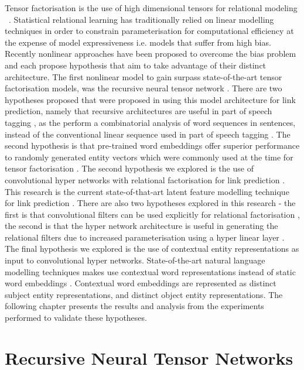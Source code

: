 Tensor factorisation is the use of high dimensional tensors for relational modeling ~\citep{Nickel_2016}. Statistical relational learning has traditionally relied on linear modelling techniques in order to constrain parameterisation for computational efficiency at the expense of model expressiveness i.e. models that suffer from high bias. Recently nonlinear approaches have been proposed to overcome the bias problem and each propose hypothesis that aim to take advantage of their distinct architecture. The first nonlinear model to gain surpass state-of-the-art tensor factorisation models, was the recursive neural tensor network \cite{refefence}. There are two hypotheses proposed that were proposed in using this model architecture for link prediction, namely that recursive architectures are useful in part of speech tagging \cite{reference}, as the perform a combinatorial analysis of word sequences in sentences, instead of the conventional linear sequence used in part of speech tagging \cite{reference}. The second hypothesis is that pre-trained word embeddings offer superior performance to randomly generated entity vectors which were commonly used at the time for tensor factorisation \cite{reference}. \newline
The second hypothesis we explored is the use of convolutional hyper networks with relational factorisation for link prediction \cite{reference}. This research is the current state-of-that-art latent feature modelling technique for link prediction \cite{reference}. There are also two hypotheses explored in this research - the first is that convolutional filters can be used explicitly for relational factorisation \cite{reference}, the second is that the hyper network architecture is useful in generating the relational filters due to increased parameterisation using a hyper linear layer \cite{reference}. \newline
The final hypothesis we explored is the use of contextual entity representations as input to convolutional hyper networks. State-of-the-art natural language modelling techniques makes use contextual word representations \cite{Elmo, Bert} instead of static word embeddings \cite{fasttext, GloVe, Word2Vec}. Contextual word embeddings are represented as distinct subject entity representations, and distinct object entity representations. \newline
The following chapter presents the results and analysis from the experiments performed to validate these hypotheses.

\section{Recursive Neural Tensor Networks}
